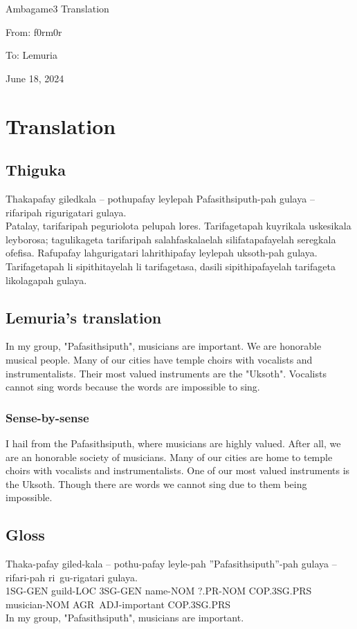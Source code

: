 \documentclass{thiguka}
\begin{document}
Ambagame3 Translation

From: f0rm0r

To: Lemuria

June 18, 2024

\section{Translation}
\subsection{Thiguka}
Thakapafay giledkala -- pothupafay leylepah Pafasithsiputh-pah gulaya -- rifaripah rigurigatari gulaya.\\
Patalay, tarifaripah peguriolota pelupah lores.
Tarifagetapah kuyrikala uskesikala leyborosa; tagulikageta tarifaripah salahfaskalaelah silifatapafayelah seregkala ofefisa.
Rafupafay lahgurigatari lahrithipafay leylepah uksoth-pah gulaya.
Tarifagetapah li sipithitayelah li tarifagetasa, dasili sipithipafayelah tarifageta likolagapah gulaya.

\subsection{Lemuria's translation}
In my group, "Pafasithsiputh", musicians are important.
We are honorable musical people.
Many of our cities have temple choirs with vocalists and instrumentalists.
Their most valued instruments are the "Uksoth".
Vocalists cannot sing words because the words are impossible to sing.

\subsubsection{Sense-by-sense}
I hail from the Pafasithsiputh, where musicians are highly valued.
After all, we are an honorable society of musicians.
Many of our cities are home to temple choirs with vocalists and instrumentalists.
One of our most valued instruments is the Uksoth.
Though there are words we cannot sing due to them being impossible.

\subsection{Gloss}
\begin{exe}
    \ex{} \gll{}Thaka-pafay giled-kala -- pothu-pafay leyle-pah ''Pafasithsiputh''-pah gulaya -- rifari-pah ri~gu-rigatari gulaya.\\
               1SG-GEN guild-LOC {} 3SG-GEN name-NOM ?.PR-NOM COP.3SG.PRS {} musician-NOM AGR~ADJ-important COP.3SG.PRS\\
          \glt{}In my group, "Pafasithsiputh", musicians are important.
\end{exe}
\end{document}
